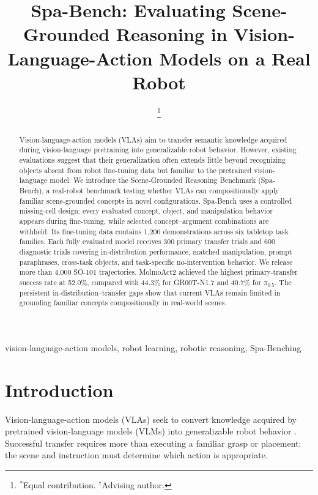 \documentclass[conference]{IEEEtran}
\title{Spa-Bench: Evaluating Scene-Grounded Reasoning in
Vision-Language-Action Models on a Real Robot}
\author{
\IEEEauthorblockN{
Justin Tien-Smith$^*$ \quad
Matthew Pidden$^*$ \quad
Rolandos Potamias$^\dagger$
}
\IEEEauthorblockA{
Imperial College London
}
\thanks{$^*$Equal contribution. $^\dagger$Advising author.}
}
\begin{document}
\maketitle

\begin{abstract}
Vision-language-action models (VLAs) aim to transfer semantic knowledge acquired during vision-language pretraining into generalizable robot behavior. However, existing evaluations suggest that their generalization often extends little beyond recognizing objects absent from robot fine-tuning data but familiar to the pretrained vision-language model. We introduce the Scene-Grounded Reasoning Benchmark (Spa-Bench), a real-robot benchmark testing whether VLAs can compositionally apply familiar scene-grounded concepts in novel configurations. Spa-Bench uses a controlled missing-cell design: every evaluated concept, object, and manipulation behavior appears during fine-tuning, while selected concept--argument combinations are withheld. Its fine-tuning data contains 1,200 demonstrations across six tabletop task families. Each fully evaluated model receives 300 primary transfer trials and 600 diagnostic trials covering in-distribution performance, matched manipulation, prompt paraphrases, cross-task objects, and task-specific no-intervention behavior. We release more than 4,000 SO-101 trajectories. MolmoAct2 achieved the highest primary-transfer success rate at 52.0\%, compared with 44.3\% for GR00T-N1.7 and 40.7\% for $\pi_{0.5}$. The persistent in-distribution--transfer gaps show that current VLAs remain limited in grounding familiar concepts compositionally in real-world scenes.
\end{abstract}


\begin{IEEEkeywords}
vision-language-action models, robot learning, robotic reasoning, Spa-Benching
\end{IEEEkeywords}

\section{Introduction}

Vision-language-action models (VLAs) seek to convert knowledge acquired by pretrained vision-language models (VLMs) into generalizable robot behavior \cite{brohan2023rt2}. Successful transfer requires more than executing a familiar grasp or placement: the scene and instruction must determine which action is appropriate.
\end{document}

